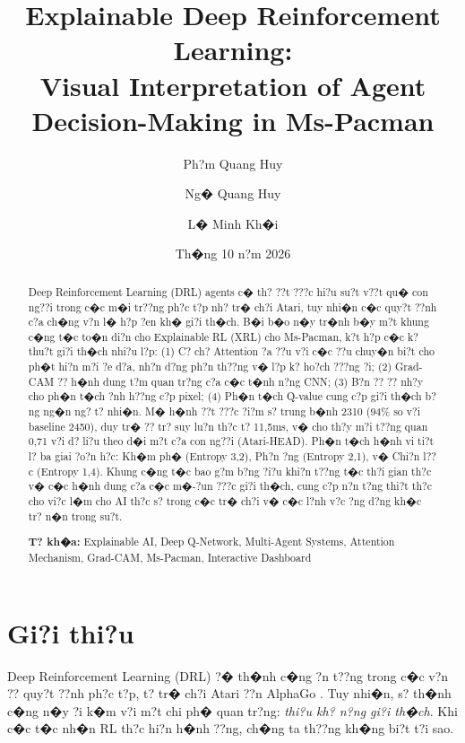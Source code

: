 \documentclass[11pt,a4paper]{article}
\title{
    \textbf{Explainable Deep Reinforcement Learning:} \\
    \textbf{Visual Interpretation of Agent Decision-Making in Ms-Pacman}
}
\author[1,2,3]{Ph?m Quang Huy}
\author[1,2,3]{Ng� Quang Huy}
\author[1,2,3]{L� Minh Kh�i}
\affil[1,2,3]{FPT University, H� N?i, Vi?t Nam}
\affil[]{M�n REL301m (Reinforcement Learning) - NamLG3}
\date{Th�ng 10 n?m 2026}
\begin{document}
\maketitle


\begin{abstract}
Deep Reinforcement Learning (DRL) agents c� th? ??t ???c hi?u su?t v??t qu� con ng??i trong c�c m�i tr??ng ph?c t?p nh? tr� ch?i Atari, tuy nhi�n c�c quy?t ??nh c?a ch�ng v?n l� h?p ?en kh� gi?i th�ch. B�i b�o n�y tr�nh b�y m?t khung c�ng t�c to�n di?n cho Explainable RL (XRL) cho Ms-Pacman, k?t h?p c�c k? thu?t gi?i th�ch nhi?u l?p: (1) C? ch? Attention ?a ??u v?i c�c ??u chuy�n bi?t cho ph�t hi?n m?i ?e d?a, nh?n d?ng ph?n th??ng v� l?p k? ho?ch ???ng ?i; (2) Grad-CAM ?? h�nh dung t?m quan tr?ng c?a c�c t�nh n?ng CNN; (3) B?n ?? ?? nh?y cho ph�n t�ch ?nh h??ng c?p pixel; (4) Ph�n t�ch Q-value cung c?p gi?i th�ch b?ng ng�n ng? t? nhi�n. M� h�nh ??t ???c ?i?m s? trung b�nh 2310 (94\% so v?i baseline 2450), duy tr� ?? tr? suy lu?n th?c t? 11,5ms, v� cho th?y m?i t??ng quan 0,71 v?i d? li?u theo d�i m?t c?a con ng??i (Atari-HEAD). Ph�n t�ch h�nh vi ti?t l? ba giai ?o?n h?c: Kh�m ph� (Entropy 3,2), Ph?n ?ng (Entropy 2,1), v� Chi?n l??c (Entropy 1,4). Khung c�ng t�c bao g?m b?ng ?i?u khi?n t??ng t�c th?i gian th?c v� c�c h�nh dung c?a c�c m�-?un ???c gi?i th�ch, cung c?p n?n t?ng thi?t th?c cho vi?c l�m cho AI th?c s? trong c�c tr� ch?i v� c�c l?nh v?c ?ng d?ng kh�c tr? n�n trong su?t.

\textbf{T? kh�a:} Explainable AI, Deep Q-Network, Multi-Agent Systems, Attention Mechanism, Grad-CAM, Ms-Pacman, Interactive Dashboard
\end{abstract}


\section{Gi?i thi?u}

Deep Reinforcement Learning (DRL) ?� th�nh c�ng ?n t??ng trong c�c v?n ?? quy?t ??nh ph?c t?p, t? tr� ch?i Atari \cite{mnih2013} ??n AlphaGo \cite{silver2016}. Tuy nhi�n, s? th�nh c�ng n�y ?i k�m v?i m?t chi ph� quan tr?ng: \emph{thi?u kh? n?ng gi?i th�ch}. Khi c�c t�c nh�n RL th?c hi?n h�nh ??ng, ch�ng ta th??ng kh�ng bi?t t?i sao.
\end{document}
